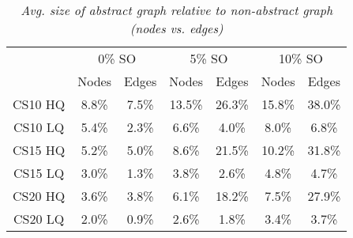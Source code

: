 \begin{table}[ht]
\begin{center}
\caption{\small{\emph{Avg. size of abstract graph relative to non-abstract graph (nodes vs. edges)}}}
\label{aha-table:graphsize}
\begin{tabular*}{0.49\textwidth}{@{\extracolsep{\fill}}ccccccc}%
  \hline
 & \multicolumn{2}{c}{\small{0\% SO}} & \multicolumn{2}{c}{\small{5\% SO}} & \multicolumn{2}{c}{\small{10\% SO}} \\
 & \small{Nodes} & \small{Edges} & \small{Nodes} & \small{Edges} & \small{Nodes} & \small{Edges} \\
  \hline
  \small{CS10 HQ} & \small{8.8\%} & \small{7.5\%} & \small{13.5\%} & \small{26.3\%} & \small{15.8\%} & \small{38.0\%} \\
  \small{CS10 LQ} & \small{5.4\%} & \small{2.3\%} & \small{6.6\%}  & \small{4.0\%}  & \small{8.0\%}  & \small{6.8\%} \\
  \small{CS15 HQ} & \small{5.2\%} & \small{5.0\%} & \small{8.6\%}  & \small{21.5\%} & \small{10.2\%}  & \small{31.8\%} \\
  \small{CS15 LQ} & \small{3.0\%} & \small{1.3\%} & \small{3.8\%}  & \small{2.6\%}  & \small{4.8\%}  & \small{4.7\%} \\
  \small{CS20 HQ} & \small{3.6\%} & \small{3.8\%} & \small{6.1\%}  & \small{18.2\%} & \small{7.5\%}  & \small{27.9\%} \\
  \small{CS20 LQ} & \small{2.0\%} & \small{0.9\%} & \small{2.6\%}  & \small{1.8\%}  & \small{3.4\%}  & \small{3.7\%} \\
   \hline
\end{tabular*}
\end{center}
\end{table}


